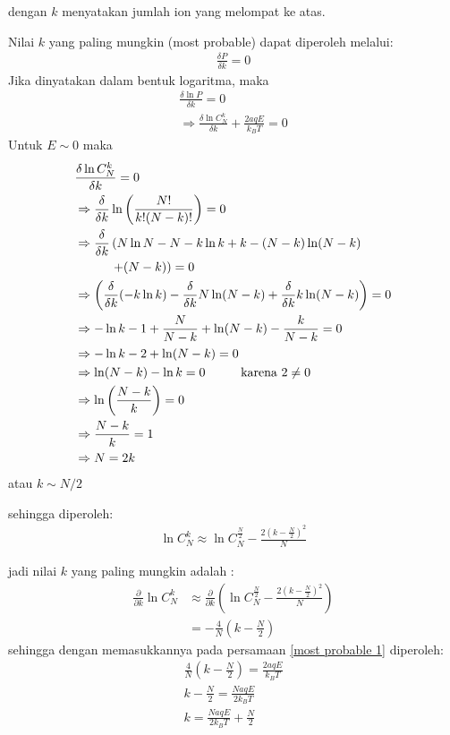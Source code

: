 \documentclass[a4paper , 12pt, cc]{article}
\begin{document}
dengan $k$ menyatakan jumlah ion yang melompat ke atas. 

Nilai $k$ yang paling mungkin (most probable) dapat diperoleh melalui:
\begin{align}
\frac{\delta P}{\delta k} =  0 
\end{align}
Jika dinyatakan dalam bentuk logaritma, maka
\begin{eqnarray}
 \frac{\delta \ln P}{\delta k} = 0  \label{nilai k 11 } \nonumber \\
 \Rightarrow \frac{\delta \ln C_N^k }{\delta k } + \frac{2aqE}{k_B T}  = 0  \label{most probable 1}
\end{eqnarray}
Untuk $E\sim 0$ maka 
\begin{align}
& \frac{\delta \ln C_N^k }{\delta k} = 0 \nonumber \\
& \Rightarrow \frac{\delta}{\delta k} \ln \left( \frac{N !}{k ! (N- k )!}\right) = 0 \nonumber \\
&  \Rightarrow  \frac{\delta }{\delta k}\left( N \ln N - N - k \ln k + k - (N - k ) \ln (N - k) \right.  \nonumber \\
& \hspace{1 cm}\left. + (N- k)  \right) = 0 \label{identitas 0}   \\
&\Rightarrow \left( \frac{\delta}{\delta k} ( - k \ln k )   - \frac{\delta}{\delta k} N \ln (N - k) + \frac{\delta }{\delta k} k \ln (N-k)  \right) = 0 \nonumber \\
& \Rightarrow - \ln k  - 1 + \frac{N}{N - k} + \ln (N - k) - \frac{k}{N- k } = 0 \nonumber\\
&\Rightarrow - \ln  k  - 2 + \ln (N - k) = 0 \nonumber \\
&\Rightarrow \ln (N - k ) - \ln k = 0 \hspace{1 cm } \text{karena } 2 \ne 0 \label{identitas 1} \\
&\Rightarrow \ln \left( \frac{N- k}{k}\right) = 0 \nonumber \\
&\Rightarrow \frac{N - k}{k} = 1 \nonumber \\
& \Rightarrow N = 2 k 
\end{align}
atau $k \sim N/2 $

sehingga diperoleh: 
\begin{align}
\boxed{\ln C_N^k  \approx  \ln C_N^{\frac{N}{2}}  - \frac{2 (k - \frac{N}{2})^2}{N}  } \label{aprrox stirling	}
\end{align}

jadi nilai $k$ yang paling mungkin adalah :
\begin{align}
 \frac{\partial}{\partial k} \ln C_N^k & \approx \frac{\partial }{\partial k } \left( \ln C_N^{\frac{N}{2}}  - \frac{2 (k - \frac{N}{2})^2}{N} \right)  \\
& = - \frac{4}{N} \left( k - \frac{N}{2}\right)
\end{align}
sehingga dengan memasukkannya pada persamaan \ref{most probable 1} diperoleh:
\begin{eqnarray}
\frac{4}{N} \left( k - \frac{N}{2}\right)  = \frac{2 a q E}{k_B T}  \nonumber \\
k - \frac{N}{2} = \frac{N aq E}{2 k_B T} \nonumber \\
k =  \frac{N aq E}{2 k_B T} + \frac{N}{2}
\end{eqnarray} 
\end{document}
